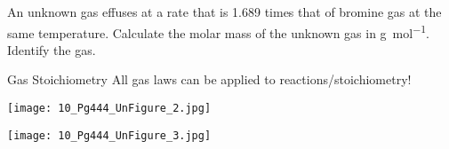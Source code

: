 \documentclass[notes=hide]{beamer}
\begin{document}

\clearpage

\begin{onyourown}
	An unknown gas effuses at a rate that is \num{1.689} times that of
	bromine gas at the same temperature. Calculate the molar mass of the
	unknown gas in \si{\gram\per\mole}. Identify the gas.
\end{onyourown}



\begin{frame}{Gas Stoichiometry}
	All gas laws can be applied to reactions/stoichiometry!

	\begin{center}
		\texttt{[image: 10\_Pg444\_UnFigure\_2.jpg]}

		\bigskip

		\texttt{[image: 10\_Pg444\_UnFigure\_3.jpg]}
	\end{center}
\end{frame}

\clearpage
\end{document}
